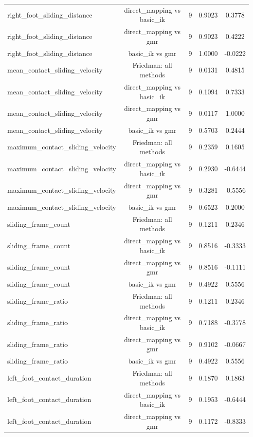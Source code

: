 \begin{table}[t]
{\begin{tabular}{lcccc}
right\_foot\_sliding\_distance & direct\_mapping vs basic\_ik & 9 & 0.9023 & 0.3778 \\
right\_foot\_sliding\_distance & direct\_mapping vs gmr & 9 & 0.9023 & 0.4222 \\
right\_foot\_sliding\_distance & basic\_ik vs gmr & 9 & 1.0000 & -0.0222 \\
mean\_contact\_sliding\_velocity & Friedman: all methods & 9 & 0.0131 & 0.4815 \\
mean\_contact\_sliding\_velocity & direct\_mapping vs basic\_ik & 9 & 0.1094 & 0.7333 \\
mean\_contact\_sliding\_velocity & direct\_mapping vs gmr & 9 & 0.0117 & 1.0000 \\
mean\_contact\_sliding\_velocity & basic\_ik vs gmr & 9 & 0.5703 & 0.2444 \\
maximum\_contact\_sliding\_velocity & Friedman: all methods & 9 & 0.2359 & 0.1605 \\
maximum\_contact\_sliding\_velocity & direct\_mapping vs basic\_ik & 9 & 0.2930 & -0.6444 \\
maximum\_contact\_sliding\_velocity & direct\_mapping vs gmr & 9 & 0.3281 & -0.5556 \\
maximum\_contact\_sliding\_velocity & basic\_ik vs gmr & 9 & 0.6523 & 0.2000 \\
sliding\_frame\_count & Friedman: all methods & 9 & 0.1211 & 0.2346 \\
sliding\_frame\_count & direct\_mapping vs basic\_ik & 9 & 0.8516 & -0.3333 \\
sliding\_frame\_count & direct\_mapping vs gmr & 9 & 0.8516 & -0.1111 \\
sliding\_frame\_count & basic\_ik vs gmr & 9 & 0.4922 & 0.5556 \\
sliding\_frame\_ratio & Friedman: all methods & 9 & 0.1211 & 0.2346 \\
sliding\_frame\_ratio & direct\_mapping vs basic\_ik & 9 & 0.7188 & -0.3778 \\
sliding\_frame\_ratio & direct\_mapping vs gmr & 9 & 0.9102 & -0.0667 \\
sliding\_frame\_ratio & basic\_ik vs gmr & 9 & 0.4922 & 0.5556 \\
left\_foot\_contact\_duration & Friedman: all methods & 9 & 0.1870 & 0.1863 \\
left\_foot\_contact\_duration & direct\_mapping vs basic\_ik & 9 & 0.1953 & -0.6444 \\
left\_foot\_contact\_duration & direct\_mapping vs gmr & 9 & 0.1172 & -0.8333 \\

\end{tabular}}
\end{table}
